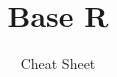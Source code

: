 \documentclass[final,hyperref={pdfpagelabels=false}]{beamer}
\title{Base R}
\subtitle{Cheat Sheet}
\begin{document}
  
  \begin{frame}[fragile]{} 
    \vfill
    \begin{columns}[t]
      \begin{column}{.25\linewidth}
        \maketitle
        
      \end{column}
      
      \begin{column}{.25\linewidth}
        
      \end{column}
      
      \begin{column}{.50\linewidth}
        
      \end{column}
    \end{columns}
    \vfill
  \end{frame}
  
  \begin{frame}[fragile]{}
    \begin{columns}[t]
      \begin{column}{0.33\linewidth}
        
      \end{column}
      
      \begin{column}{0.33\linewidth}
        
      \end{column}
            
      \begin{column}{0.33\linewidth}
        
      \end{column}
    \end{columns}
  \end{frame}
\end{document}
